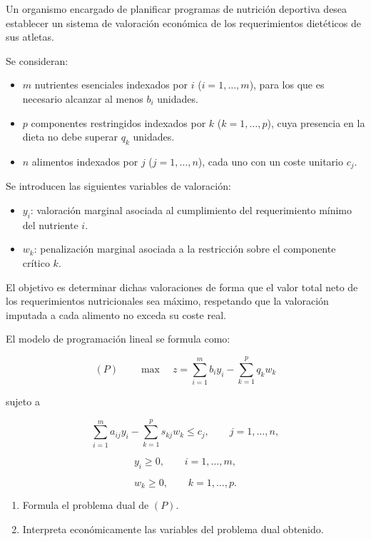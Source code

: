 Un organismo encargado de planificar programas de nutrición deportiva desea establecer un sistema de valoración económica de los requerimientos dietéticos de sus atletas.

Se consideran:

\begin{itemize}
    \item $m$ nutrientes esenciales indexados por $i$ ($i=1,\ldots,m$), para los que es necesario alcanzar al menos $b_i$ unidades.
    \item $p$ componentes restringidos indexados por $k$ ($k=1,\ldots,p$), cuya presencia en la dieta no debe superar $q_k$ unidades.
    \item $n$ alimentos indexados por $j$ ($j=1,\ldots,n$), cada uno con un coste unitario $c_j$.
\end{itemize}

Se introducen las siguientes variables de valoración:

\begin{itemize}
    \item $y_i$: valoración marginal asociada al cumplimiento del requerimiento mínimo del nutriente $i$.
    \item $w_k$: penalización marginal asociada a la restricción sobre el componente crítico $k$.
\end{itemize}

El objetivo es determinar dichas valoraciones de forma que el valor total neto de los requerimientos nutricionales sea máximo, respetando que la valoración imputada a cada alimento no exceda su coste real.

El modelo de programación lineal se formula como:

\[
(P)\qquad
\max \quad
z=
\sum_{i=1}^{m} b_i y_i
-
\sum_{k=1}^{p} q_k w_k
\]

sujeto a

\[
\sum_{i=1}^{m} a_{ij}y_i
-
\sum_{k=1}^{p} s_{kj}w_k
\le c_j,
\qquad
j=1,\ldots,n,
\]

\[
y_i \ge 0,
\qquad
i=1,\ldots,m,
\]

\[
w_k \ge 0,
\qquad
k=1,\ldots,p.
\]

\begin{enumerate}
    \item Formula el problema dual de $(P)$.
    \item Interpreta económicamente las variables del problema dual obtenido.
\end{enumerate}